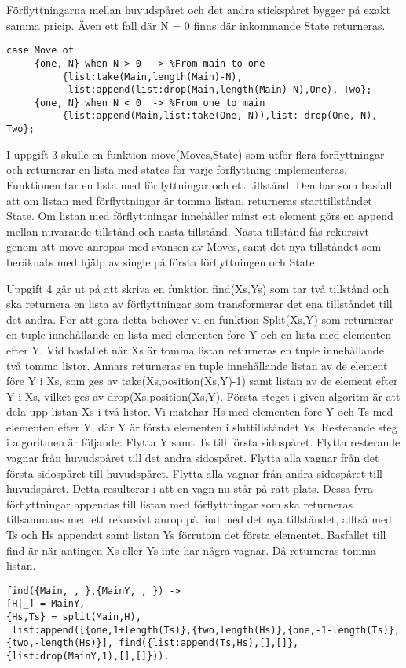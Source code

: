 \documentclass[a4paper, 11pt]{article}
\begin{document}
Förflyttningarna mellan huvudspåret och det andra stickspåret bygger på exakt samma pricip. Även ett fall där N = 0 finns där inkommande State returneras.
\begin{verbatim}
case Move of
     {one, N} when N > 0  -> %From main to one
          {list:take(Main,length(Main)-N), 
           list:append(list:drop(Main,length(Main)-N),One), Two};
     {one, N} when N < 0  -> %From one to main
          {list:append(Main,list:take(One,-N)),list: drop(One,-N), Two};
\end{verbatim}

I uppgift 3 skulle en funktion move(Moves,State) som utför flera förflyttningar och returnerar en lista med states för varje förflyttning implementeras. Funktionen tar en lista med förflyttningar och ett tillstånd. Den har som basfall att om listan med förflyttningar är tomma listan, returneras starttillståndet State. Om listan med förflyttningar innehåller minst ett element görs en append mellan nuvarande tillstånd och nästa tillstånd. Nästa tillstånd fås rekursivt genom att move anropas med svansen av Moves, samt det nya tillståndet som beräknats med hjälp av single på första förflyttningen och State.

Uppgift 4 går ut på att skriva en funktion find(Xs,Ys) som tar två tillstånd och ska returnera en lista av förflyttningar som transformerar det ena tillståndet till det andra. För att göra detta behöver vi en funktion Split(Xs,Y) som returnerar en tuple innehållande en lista med elementen före Y och en lista med elementen efter Y. Vid basfallet när Xs är tomma listan returneras en tuple innehållande två tomma listor.  Annars returneras en tuple innehållande listan av de element före Y i Xs, som ges av take(Xs,position(Xs,Y)-1) samt listan av de element efter Y i Xs, vilket ges av drop(Xs,position(Xs,Y). 
Första steget i given algoritm är att dela upp listan Xs i två listor. Vi matchar Hs med elementen före Y och Ts med elementen efter Y, där Y är första elementen i sluttillståndet Ys.
Resterande steg i algoritmen är följande: Flytta Y samt Ts till första sidospåret. Flytta resterande vagnar från huvudspåret till det andra sidospåret. Flytta alla vagnar från det första sidospåret till huvudspåret. Flytta alla vagnar från andra sidospåret till huvudspåret. Detta resulterar i att en vagn nu står på rätt plats. Dessa fyra förflyttningar appendas till listan med förflyttningar som ska returneras tillsammans med ett rekursivt anrop på find med det nya tillståndet, alltså med Ts och Hs appendat samt listan Ys förrutom det första elementet. Basfallet till find är när antingen Xs eller Ys inte har några vagnar. Då returneras tomma listan.
\begin{verbatim}
find({Main,_,_},{MainY,_,_}) ->
[H|_] = MainY,
{Hs,Ts} = split(Main,H),
 list:append([{one,1+length(Ts)},{two,length(Hs)},{one,-1-length(Ts)},
{two,-length(Hs)}], find({list:append(Ts,Hs),[],[]},{list:drop(MainY,1),[],[]})).
\end{verbatim}
\end{document}

